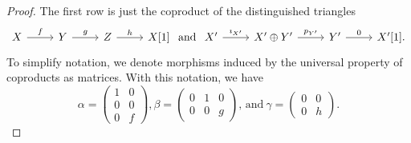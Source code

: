 \documentclass[dissertation.tex]{subfiles}
\begin{document}
\begin{prop}
\begin{proof}
  The first row is just the coproduct of the distinguished triangles
  $$\begin{tikzcd}
    X \arrow{r}{f} & Y \arrow{r}{g} & Z \arrow{r}{h} & X[1]
  \end{tikzcd}
  \ \text{and}\ 
  \begin{tikzcd}
    X^\prime \arrow{r}{\imath_{X^\prime}} & X^\prime \oplus Y^\prime \arrow{r}{p_{Y^\prime}} & Y^\prime \arrow{r}{0} & X^\prime[1].
  \end{tikzcd}$$
  To simplify notation, we denote morphisms induced by the universal property of coproducts as matrices.
  With this notation, we have 
  $$\alpha = \left(\begin{matrix}
    1 & 0\\
    0 & 0\\
    0 & f
  \end{matrix}\right),
  \beta = \left(\begin{matrix}
    0 & 1 & 0\\
    0 & 0 & g
  \end{matrix}\right),
  \, \text{and}\ 
  \gamma = \left(\begin{matrix}
    0 & 0\\
    0 & h
  \end{matrix}\right).$$


\end{proof}
\end{prop}
\end{document}
